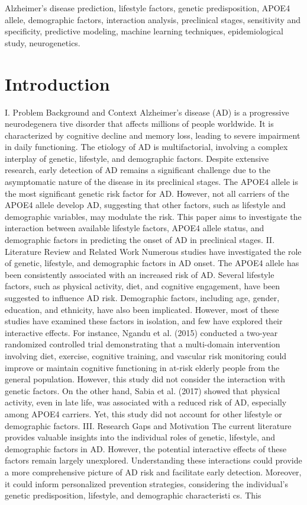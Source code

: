 \documentclass[conference]{IEEEtran}
\begin{document}
\begin{IEEEkeywords}
Alzheimer's disease prediction, lifestyle factors, genetic predisposition, APOE4 allele, demographic factors, interaction analysis, preclinical stages, sensitivity and specificity, predictive modeling, machine learning techniques, epidemiological study, neurogenetics.
\end{IEEEkeywords}

\section{Introduction}
I. Problem Background and Context Alzheimer's disease (AD) is a progressive neurodegenera tive disorder that affects millions of people worldwide. It is characterized by cognitive decline and memory loss, leading to severe impairment in daily functioning. The etiology of AD is multifactorial, involving a complex interplay of genetic, lifestyle, and demographic factors. Despite extensive research, early detection of AD remains a significant challenge due to the asymptomatic nature of the disease in its preclinical stages. The APOE4 allele is the most significant genetic risk factor for AD. However, not all carriers of the APOE4 allele develop AD, suggesting that other factors, such as lifestyle and demographic variables, may modulate the risk. This paper aims to investigate the interaction between available lifestyle factors, APOE4 allele status, and demographic factors in predicting the onset of AD in preclinical stages. II. Literature Review and Related Work Numerous studies have investigated the role of genetic, lifestyle, and demographic factors in AD onset. The APOE4 allele has been consistently associated with an increased risk of AD. Several lifestyle factors, such as physical activity, diet, and cognitive engagement, have been suggested to influence AD risk. Demographic factors, including age, gender, education, and ethnicity, have also been implicated. However, most of these studies have examined these factors in isolation, and few have explored their interactive effects. For instance, Ngandu et al. (2015) conducted a two-year randomized controlled trial demonstrating that a multi-domain intervention involving diet, exercise, cognitive training, and vascular risk monitoring could improve or maintain cognitive functioning in at-risk elderly people from the general population. However, this study did not consider the interaction with genetic factors. On the other hand, Sabia et al. (2017) showed that physical activity, even in late life, was associated with a reduced risk of AD, especially among APOE4 carriers. Yet, this study did not account for other lifestyle or demographic factors. III. Research Gaps and Motivation The current literature provides valuable insights into the individual roles of genetic, lifestyle, and demographic factors in AD. However, the potential interactive effects of these factors remain largely unexplored. Understanding these interactions could provide a more comprehensive picture of AD risk and facilitate early detection. Moreover, it could inform personalized prevention strategies, considering the individual's genetic predisposition, lifestyle, and demographic characteristi cs. This 
\end{document}

